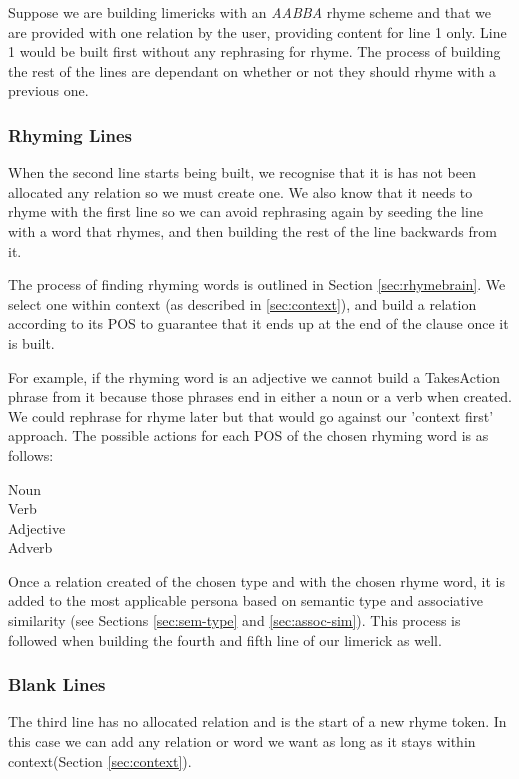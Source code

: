 Suppose we are building limericks with an \textit{AABBA} rhyme scheme and that we are provided with one relation by the user, providing content for line 1 only. Line 1 would be built first without any rephrasing for rhyme. The process of building the rest of the lines are dependant on whether or not they should rhyme with a previous one.

\subsubsection{Rhyming Lines}
When the second line starts being built, we recognise that it is has not been allocated any relation so we must create one. We also know that it needs to rhyme with the first line so we can avoid rephrasing again by seeding the line with a word that rhymes, and then building the rest of the line backwards from it.

The process of finding rhyming words is outlined in Section \ref{sec:rhymebrain}. We select one within context (as described in \ref{sec:context}), and build a relation according to its POS to guarantee that it ends up at the end of the clause once it is built.

For example, if the rhyming word is an adjective we cannot build a TakesAction phrase from it because those phrases end in either a noun or a verb when created. We could rephrase for rhyme later but that would go against our 'context first' approach. The possible actions for each POS of the chosen rhyming word is as follows:
\begin{description}
\item[Noun]
\item[Verb]
\item[Adjective]
\item[Adverb]
\end{description}

Once a relation created of the chosen type and with the chosen rhyme word, it is added to the most applicable persona based on semantic type and associative similarity (see Sections \ref{sec:sem-type} and \ref{sec:assoc-sim}). This process is followed when building the fourth and fifth line of our limerick as well.

\subsubsection{Blank Lines}
The third line has no allocated relation and is the start of a new rhyme token. In this case we can add any relation or word we want as long as it stays within context(Section \ref{sec:context}).

